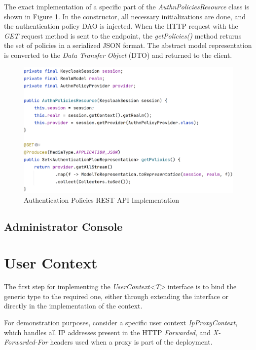 The exact implementation of a specific part of the \textit{AuthnPoliciesResource} class is shown in Figure \ref{fig:impl-authn-policies-rest-impl}.
In the constructor, all necessary initializations are done, and the authentication policy DAO is injected.
When the HTTP request with the \textit{GET} request method is sent to the endpoint, the \textit{getPolicies()} method returns the set of policies in a serialized JSON format.
The abstract model representation is converted to the \textit{Data Transfer Object} (DTO) and returned to the client.

\begin{figure}[htbp]
  \centering
  \includegraphics[width=1\textwidth]{img/sections/6-implementation/authn-policy-rest-example.png}
  \caption{Authentication Policies REST API Implementation}
  \label{fig:impl-authn-policies-rest-impl}
\end{figure}

\newpage

\subsection{Administrator Console} \label{impl-authn-policies-admin}

\newpage
\section{User Context}
The first step for implementing the \textit{UserContext<T>} interface is to bind the generic type to the required one, either through extending the interface or directly in the implementation of the context.

For demonstration purposes, consider a specific user context \textit{IpProxyContext}, which handles all IP addresses present in the HTTP \textit{Forwarded}, and \textit{X-Forwarded-For} headers used when a proxy is part of the deployment.

